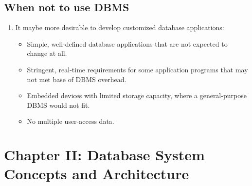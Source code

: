 \documentclass[10pt]{article}
\begin{document}
\subsection{When not to use DBMS}
\begin{enumerate}
	\item It maybe more desirable to develop customized database applications:
	\begin{itemize}
		\item Simple, well-defined database applications that are not expected to change at all.
		\item Stringent, real-time requirements for some application programs that may not met base of DBMS overhead.
		\item Embedded devices with limited storage capacity, where a general-purpose DBMS would not fit.
		\item No multiple user-access data.
	\end{itemize}
\end{enumerate}

\bigbreak
\section*{Chapter II: Database System Concepts and Architecture}
\end{document}

